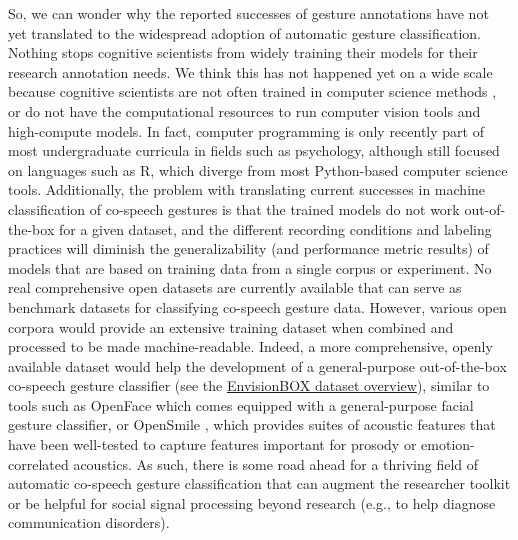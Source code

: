 \documentclass[11pt,headings=small,cleardoublepage=empty,tocflat,numbers=noenddot,twoside,captions=tableheading]{scrbook}
\begin{document}
\begin{refsection}
So, we can wonder why the reported successes of gesture annotations have not yet translated to the widespread adoption of automatic gesture classification. Nothing stops cognitive scientists from widely training their models for their research annotation needs. We think this has not happened yet on a wide scale because cognitive scientists are not often trained in computer science methods \parencite{sieversDeepSocialNeuroscience2024}, or do not have the computational resources to run computer vision tools and high-compute models. In fact, computer programming is only recently part of most undergraduate curricula in fields such as psychology, although still focused on languages such as R, which diverge from most Python-based computer science tools. Additionally, the problem with translating current successes in machine classification of co-speech gestures is that the trained models do not work out-of-the-box for a given dataset, and the different recording conditions and labeling practices will diminish the generalizability (and performance metric results) of models that are based on training data from a single corpus or experiment. No real comprehensive open datasets are currently available that can serve as benchmark datasets for classifying co-speech gesture data. However, various open corpora would provide an extensive training dataset when combined and processed to be made machine-readable. Indeed, a more comprehensive, openly available dataset would help the development of a general-purpose out-of-the-box co-speech gesture classifier (see the \href{https://envisionbox.org/multimodaldatasets.html}{EnvisionBOX dataset overview}), similar to tools such as OpenFace \parencite{baltrusaitisOpenFaceOpenSource2016} which comes equipped with a general-purpose facial gesture classifier, or OpenSmile \parencite{eybenOpensmileMunichVersatile2010}, which provides suites of acoustic features that have been well-tested to capture features important for prosody or emotion-correlated acoustics. As such, there is some road ahead for a thriving field of automatic co-speech gesture classification that can augment the researcher toolkit or be helpful for social signal processing beyond research (e.g., to help diagnose communication disorders).



\end{refsection}
\end{document}
